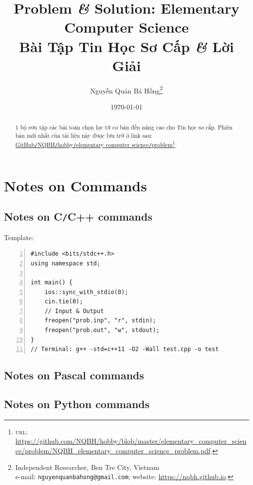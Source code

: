 \documentclass{article}
\title{Problem \textit{\&} Solution: Elementary Computer Science\\Bài Tập Tin Học Sơ Cấp \textit{\&} Lời Giải}
\author{Nguyễn Quản Bá Hồng\footnote{Independent Researcher, Ben Tre City, Vietnam\\e-mail: {\tt nguyenquanbahong@gmail.com}; website: \url{https://nqbh.github.io}.}}
\date{\today}
\begin{document}
\maketitle
\begin{abstract}
	1 bộ sưu tập các bài toán chọn lọc từ cơ bản đến nâng cao cho Tin học sơ cấp. Phiên bản mới nhất của tài liệu này được lưu trữ ở link sau: \href{https://github.com/NQBH/hobby/blob/master/elementary_computer_science/problem/NQBH_elementary_computer_science_problem.pdf}{GitHub{\tt /}NQBH{\tt /}hobby{\tt /}elementary computer science{\tt /}problem}\footnote{\textsc{url}: \url{https://github.com/NQBH/hobby/blob/master/elementary_computer_science/problem/NQBH_elementary_computer_science_problem.pdf}.}.
\end{abstract}
\tableofcontents


\section{Notes on Commands}

\subsection{Notes on C{\tt /}C++ commands}
Template:
\begin{Verbatim}[numbers=left,xleftmargin=5mm]
#include <bits/stdc++.h>
using namespace std;

int main() {
    ios::sync_with_stdio(0);
    cin.tie(0);
    // Input & Output
    freopen("prob.inp", "r", stdin);
    freopen("prob.out", "w", stdout);	
}
// Terminal: g++ -std=c++11 -O2 -Wall test.cpp -o test
\end{Verbatim}

\subsection{Notes on Pascal commands}

\subsection{Notes on Python commands}
\end{document}
